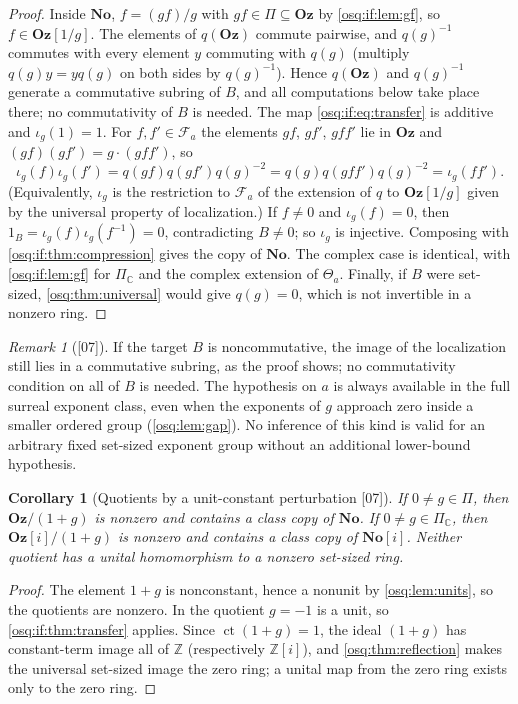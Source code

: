 \documentclass[11pt,letterpaper]{article}
\numberwithin{equation}{section}
\newtheorem{corollary}[corollary]{Corollary}
\theoremstyle{definition}
\theoremstyle{remark}
\newtheorem{remark}[remark]{Remark}
\theoremstyle{plain}
\newcommand{\No}{\mathbf{No}}
\newcommand{\Oz}{\mathbf{Oz}}
\newcommand{\SC}{\No[i]}
\newcommand{\GOz}{\Oz[i]}
\newcommand{\Z}{\mathbb Z}
\newcommand{\C}{\mathbb C}
\newcommand{\FF}{\mathscr F}         %
\newcommand{\ct}{\operatorname{ct}}
\newcommand{\src}[1]{\textup{\textsf{[#1]}}}
\begin{document}
\begin{proof}
Inside $\No$, $f=(gf)/g$ with $gf\in\Pi\subseteq\Oz$ by \cref{osq:if:lem:gf}, so
$f\in\Oz[1/g]$. The elements of $q(\Oz)$ commute pairwise, and $q(g)^{-1}$ commutes with
every element $y$ commuting with $q(g)$ (multiply $q(g)y=yq(g)$ on both sides by
$q(g)^{-1}$). Hence $q(\Oz)$ and $q(g)^{-1}$ generate a commutative subring of $B$, and all
computations below take place there; no commutativity of $B$ is needed. The map
\eqref{osq:if:eq:transfer} is additive and $\iota_g(1)=1$. For $f,f'\in\FF_a$ the
elements $gf$, $gf'$, $gff'$ lie in $\Oz$ and $(gf)(gf')=g\cdot(gff')$, so
\[
 \iota_g(f)\iota_g(f')=q(gf)q(gf')q(g)^{-2}=q(g)q(gff')q(g)^{-2}=\iota_g(ff').
\]
(Equivalently, $\iota_g$ is the restriction to $\FF_a$ of the extension of $q$ to
$\Oz[1/g]$ given by the universal property of localization.) If $f\ne0$ and
$\iota_g(f)=0$, then $1_B=\iota_g(f)\iota_g(f^{-1})=0$, contradicting $B\ne0$; so
$\iota_g$ is injective. Composing with \cref{osq:if:thm:compression} gives the copy of
$\No$. The complex case is identical, with \cref{osq:if:lem:gf} for $\Pi_\C$ and the
complex extension of $\Theta_a$. Finally, if $B$ were set-sized,
\cref{osq:thm:universal} would give $q(g)=0$, which is not invertible in a nonzero ring.
\end{proof}

\begin{remark}[\src{07}]\label{osq:if:rem:transfer}
If the target $B$ is noncommutative, the image of the localization still lies in a
commutative subring, as the proof shows; no commutativity condition on all of $B$ is
needed. The hypothesis on $a$ is always available in the full surreal exponent class, even
when the exponents of $g$ approach zero inside a smaller ordered group
(\cref{osq:lem:gap}). No inference of this kind is valid for an arbitrary fixed
set-sized exponent group without an additional lower-bound hypothesis.
\end{remark}

\begin{corollary}[Quotients by a unit-constant perturbation \src{07}]
\label{osq:if:cor:unitconstant}
If $0\ne g\in\Pi$, then $\Oz/(1+g)$ is nonzero and contains a class copy of $\No$. If
$0\ne g\in\Pi_\C$, then $\GOz/(1+g)$ is nonzero and contains a class copy of $\SC$. Neither
quotient has a unital homomorphism to a nonzero set-sized ring.
\end{corollary}

\begin{proof}
The element $1+g$ is nonconstant, hence a nonunit by \cref{osq:lem:units}, so the
quotients are nonzero. In the quotient $g=-1$ is a unit, so
\cref{osq:if:thm:transfer} applies. Since $\ct(1+g)=1$, the ideal $(1+g)$ has constant-term
image all of $\Z$ (respectively $\Z[i]$), and \cref{osq:thm:reflection} makes the
universal set-sized image the zero ring; a unital map from the zero ring exists only to the
zero ring.
\end{proof}
\end{document}
